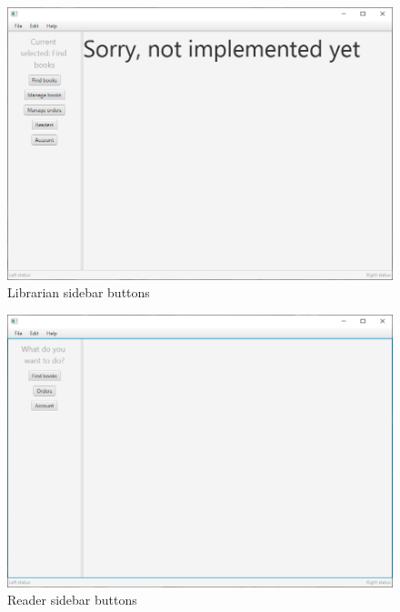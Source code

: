 \begin{figure}[H]
    \centering
    \includegraphics[width=\textwidth]{Include/Resources/FrontendScreens/JavaFX/librarianNotImplemented.png}
    \caption{Librarian sidebar buttons}
    \label{fig:ScreenshotGUIlibrarianNotImplemented}
\end{figure}




\begin{figure}[H]
    \centering
    \includegraphics[width=\textwidth]{Include/Resources/FrontendScreens/JavaFX/readerNotSelected.png}
    \caption{Reader sidebar buttons}
    \label{fig:ScreenshotGUIreaderNotSelected}
\end{figure}



